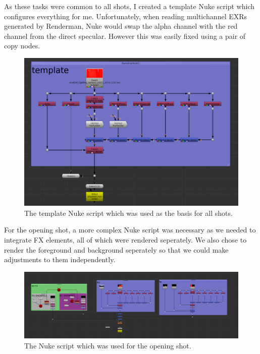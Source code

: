 \documentclass[11pt]{article}
\begin{document}
As these tasks were common to all shots, I created a template Nuke script which configures everything for me. Unfortunately, when reading multichannel EXRs generated by Renderman, Nuke would swap the alpha channel with the red channel from the direct specular. However this was easily fixed using a pair of copy nodes.

\begin{figure}[htbp]\centering
	\includegraphics[width=1.0\linewidth]{images/compTemplate.png}
	\caption{\label{figure:compTemplate} The template Nuke script which was used as the basis for all shots.}
\end{figure}

For the opening shot, a more complex Nuke script was necessary as we needed to integrate FX elements, all of which were rendered seperately. We also chose to render the foreground and background seperately so that we could make adjustments to them independently.
\begin{figure}[htbp]\centering
	\includegraphics[width=1.0\linewidth]{images/shot010comp.png}
	\caption{\label{figure:shot010comp} The Nuke script which was used for the opening shot.}
\end{figure}



\end{document}

